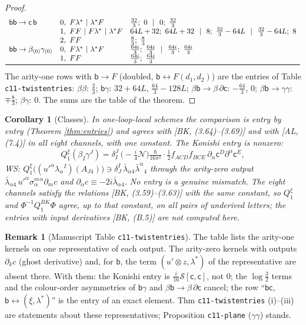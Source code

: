 \documentclass[11pt]{article}
\newtheorem{corollary}[theorem]{Corollary}
\theoremstyle{definition}
\newtheorem{remark}[theorem]{Remark}
\newcommand{\Qx}{Q^{\xi}}
\newcommand{\WS}{\textup{WS}}
\begin{document}
\begin{proof}
\[\begin{array}{lll}
\mathsf b\mathsf b\to\mathsf c\,\mathsf b&0,\ F\lambda^*\ |\ \lambda^*F&\tfrac{32}3;\ 0\ \ |\ \ 0;\ \tfrac{32}3\\
&1,\ FF\ |\ F\lambda^*\ |\ \lambda^*F&64L+32;\ 64L+32\ \ |\ \ 8;\ \tfrac{32}3-64L\ \ |\ \ \tfrac{32}3-64L;\ 8\\
&2,\ FF&\tfrac83;\ \tfrac83\\
\mathsf b\mathsf b\to\beta_{(0)}\gamma_{(0)}&0,\ F\lambda^*\ |\ \lambda^*F&\tfrac{64i}3;\ \tfrac{64i}3\ \ |\ \ \tfrac{64i}3;\ \tfrac{64i}3\\
&1,\ FF&\tfrac{64i}3;\ \tfrac{64i}3\\\bottomrule
\end{array}
\]
The arity-one rows with $\mathsf b\to F$ (doubled, $\mathsf b\leftrightarrow F(d_1,d_2)$) are the entries of Table \texttt{c11-twistentries}: $\beta\beta$: $\tfrac23$; $\mathsf b\gamma$: $32+64L$, $\tfrac{64}3-128L$; $\beta\mathsf b\to\beta\,\partial\mathsf c$: $-\tfrac{64}3$, $0$; $\beta\mathsf b\to\gamma\gamma$: $\mp\tfrac83$; $\beta\gamma$: $0$. The sums are the table of the theorem.
\end{proof}

\begin{corollary}[Classes]\label{cor:classes}
In one-loop-local schemes the comparison is entry by entry (Theorem \ref{thm:entries}) and agrees with [BK, (3.64)--(3.69)] and with [AL, (7.4)] in all eight channels, with one constant. The Konishi entry is nonzero:
\[
\Qx_1(\beta_I\gamma^J)=\delta_I^J\,\big(-\tfrac i4\mathcal N\big)\tfrac{\hbar}{16\pi^2}\cdot\tfrac12f_{ACD}f_{BCE}\,\partial_{\dot\alpha}\mathsf c^D\partial^{\dot\alpha}\mathsf c^E ,
\]
\WS: $\Qx_1\big((u'^\alpha\lambda_\alpha{}^I)(A_{J4})\big)\ni\delta^I_J\,\bar\lambda_{\dot\alpha4}\bar\lambda^{\dot\alpha}{}_4$ through the arity-zero output $\bar\lambda_{\dot\alpha4}\,u'^\alpha\sigma^m_{\alpha}{}^{\dot\alpha}\partial_mc$ and $\partial_{\dot\alpha}c\equiv-2i\bar\lambda_{\dot\alpha4}$. No entry is a genuine mismatch. The eight channels satisfy the relations [BK, (3.59)--(3.63)] with the same constant, so $\Qx_1$ and $\Phi^{-1}Q_1^{BK}\Phi$ agree, up to that constant, on all pairs of underived letters; the entries with input derivatives [BK, (B.5)] are not computed here.
\end{corollary}

\begin{remark}[Manuscript Table \texttt{c11-twistentries}]
The table lists the arity-one kernels on one representative of each output. The arity-zero kernels with outputs $\partial_k c$ (ghost derivative) and, for $\mathsf b$, the term $(u'\otimes z,\lambda^*)$ of the representative are absent there. With them: the Konishi entry is $\tfrac i{16}\mathcal S[\mathsf c,\mathsf c]$, not $0$; the $\log\tfrac32$ terms and the colour-order asymmetries of $\mathsf b\gamma$ and $\beta\mathsf b\to\beta\,\partial\mathsf c$ cancel; the row ``$\mathsf b\mathsf c$, $\mathsf b\leftrightarrow(\xi,\lambda^*)$'' is the entry of an exact element. Thm \texttt{c11-twistentries} (i)--(iii) are statements about these representatives; Proposition \texttt{c11-plane} ($\gamma\gamma$) stands.
\end{remark}
\end{document}
